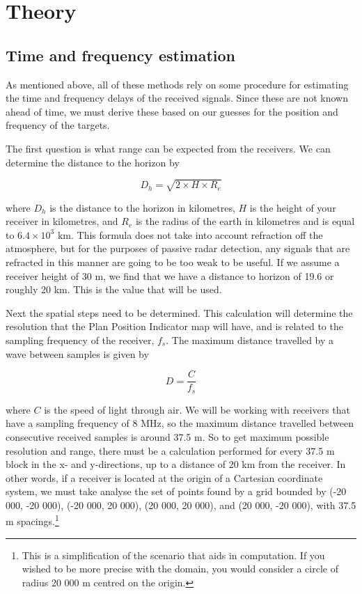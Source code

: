 \documentclass[12pt,openany,a4paper]{book}
\begin{document}
\section{Theory}

\subsection{Time and frequency estimation}
\label{sec:TFE}
As mentioned above, all of these methods rely on some procedure for estimating the time and frequency delays of the received signals. Since these are not known ahead of time, we must derive these based on our guesses for the position and frequency of the targets.

\bigskip

The first question is what range can be expected from the receivers. We can determine the distance to the horizon by \cite{RHB}

\begin{equation}
D_{h} = \sqrt{2 \times H \times R_{e}}
\end{equation}

\bigskip

where $D_{h}$ is the distance to the horizon in kilometres, $H$ is the height of your receiver in kilometres, and $R_{e}$ is the radius of the earth in kilometres and is equal to $6.4\times 10^{3}$ km. This formula does not take into account refraction off the atmosphere, but for the purposes of passive radar detection, any signals that are refracted in this manner are going to be too weak to be useful. If we assume a receiver height of 30 m, we find that we have a distance to horizon of 19.6 or roughly 20 km. This is the value that will be used.

\bigskip

Next the spatial steps need to be determined. This calculation will determine the resolution that the Plan Position Indicator map will have, and is related to the sampling frequency of the receiver, $f_{s}$. The maximum distance travelled by a wave between samples is given by 

\begin{equation}
D = \frac{C}{f_{s}}
\end{equation}

\bigskip

where $C$ is the speed of light through air. We will be working with receivers that have a sampling frequency of 8 MHz, so the maximum distance travelled between consecutive received samples is around 37.5 m. So to get maximum possible resolution and range, there must be a calculation performed for every 37.5 m block in the x- and y-directions, up to a distance of 20 km from the receiver. In other words, if a receiver is located at the origin of a Cartesian coordinate system, we must take analyse the set of points found by a grid bounded by (-20 000, -20 000), (-20 000, 20 000), (20 000, 20 000), and (20 000, -20 000), with 37.5 m spacings.\footnote{This is a simplification of the scenario that aids in computation. If you wished to be more precise with the domain, you would consider a circle of radius 20 000 m centred on the origin.} 
\end{document}
